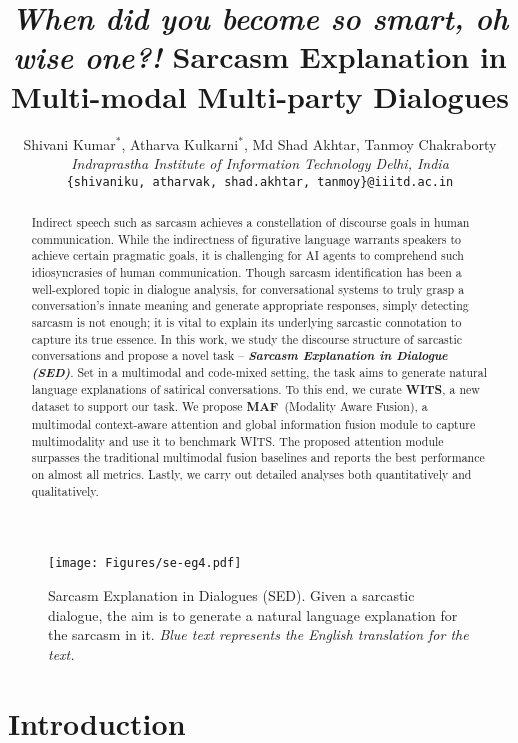 \documentclass[11pt]{article}
\title{\textit{When did you become so smart, oh wise one?!} Sarcasm Explanation in Multi-modal Multi-party Dialogues}
\author{
    Shivani Kumar$^{*}$, Atharva Kulkarni$^{*}$, Md Shad Akhtar, Tanmoy Chakraborty \\
    \textit{Indraprastha Institute of Information Technology Delhi, India} \\
    \texttt{\{shivaniku, atharvak, shad.akhtar, tanmoy\}@iiitd.ac.in}
}
\newcommand{\dataset}{\textsc{WITS}}
\newcommand{\model}{\textsc{MAF}}
\newcommand{\task}{\textsc{SED}}
\begin{document}
\maketitle



\begin{abstract}
Indirect speech such as sarcasm achieves a constellation of discourse goals in human communication. While the indirectness of figurative language warrants speakers to achieve certain pragmatic goals, it is challenging for AI agents to comprehend such idiosyncrasies of human communication. Though sarcasm identification has been a well-explored topic in dialogue analysis, for conversational systems to truly grasp a conversation's innate meaning and generate appropriate responses, simply detecting sarcasm is not enough; it is vital to explain its underlying sarcastic connotation to capture its true essence. In this work, we study the discourse structure of sarcastic conversations and propose a novel task -- {\bf \em Sarcasm Explanation in Dialogue (\task)}. Set in a multimodal and code-mixed setting, the task aims to generate natural language explanations of satirical conversations. To this end, we curate \textbf{\dataset}, a new dataset to support our task. We propose \textbf{\model}\ (Modality Aware Fusion), a multimodal context-aware attention and global information fusion module to capture multimodality and use it to benchmark \dataset. The proposed attention module surpasses the traditional multimodal fusion baselines and reports the best performance on almost all metrics. Lastly, we carry out detailed analyses both quantitatively and qualitatively.

\end{abstract}


\vspace{-1em}
\begin{figure}
    \centering
    \texttt{[image: Figures/se-eg4.pdf]}
    \caption{Sarcasm Explanation in Dialogues (\task). Given a sarcastic dialogue, the aim is to generate a natural language explanation for the sarcasm in it. \textit{\color{blue}Blue text represents the English translation for the text.}}
    \label{fig:se_eg}
    \vspace{-5mm}
\end{figure}

\section{Introduction}
\end{document}
